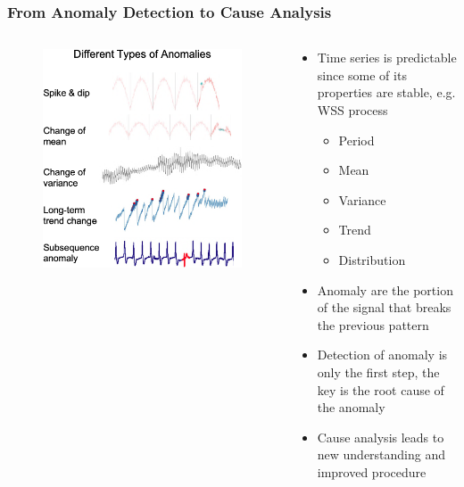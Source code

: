 \documentclass[aspectratio=169,xcolor=x11names,table]{beamer}
\begin{document}
\begin{frame}
	\frametitle{From Anomaly Detection to Cause Analysis}
	\begin{columns}
		\begin{column}{0.4\linewidth}
			\begin{figure}
				\centering
				\includegraphics[width=\columnwidth]{anomaly}
			\end{figure}
		\end{column}
		\hfill
		\begin{column}{0.55\linewidth}
			\begin{itemize}
				\item Time series is predictable since some of its properties are stable, e.g. WSS process
					\begin{itemize}
						\item Period
						\item Mean
						\item Variance
						\item Trend
						\item Distribution
					\end{itemize}
				\item Anomaly are the portion of the signal that breaks the previous pattern
				\item Detection of anomaly is only the first step, the key is the root cause of the anomaly
				\item Cause analysis leads to new understanding and improved procedure 
			\end{itemize}
		\end{column}
	\end{columns}
\end{frame}
\end{document}
